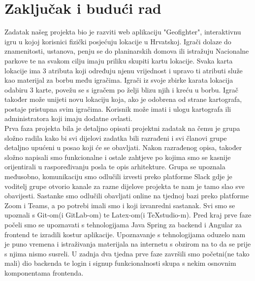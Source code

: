 \chapter{Zaključak i budući rad}
		
		\textnormal{Zadatak našeg projekta bio je razviti web aplikaciju "Geofighter", interaktivnu igru u kojoj korisnici fizički posjećuju lokacije u Hrvatskoj. Igrači dolaze do znamenitosti, ustanova, penju se do planinarskih domova ili istražuju Nacionalne parkove te na svakom cilju imaju priliku skupiti kartu lokacije. Svaka karta lokacije ima 3 atributa koji određuju njenu vrijednost i upravo ti atributi služe kao materijal za borbu među igračima. Igrači iz svoje zbirke karata lokacija odabiru 3 karte, povežu se s igračem po želji blizu njih i kreću u borbu. Igrač također može unijeti novu lokaciju koja, ako je odobrena od strane kartografa, postaje pristupna svim igračima. Korisnik može imati i ulogu kartografa ili administratora koji imaju dodatne ovlasti.}\\
		 
		 \textnormal{Prva faza projekta bila je detaljno opisati projektni zadatak na čemu je grupa složno radila kako bi svi dijelovi zadatka bili razrađeni i svi članovi grupe detaljno upućeni u posao koji će se obavljati. Nakon razrađenog opisa, također složno napisali smo funkcionalne i ostale zahtjeve po kojima smo se kasnije orijentirali u raspoređivanju posla te opis arhitekture. Grupa se upoznala međusobno, komunikaciju smo odlučili izvesti preko platforme Slack gdje je voditelj grupe otvorio kanale za razne dijelove projekta te nam je tamo slao sve obavijesti. Sastanke smo odlučili obavljati online na tjednoj bazi preko platforme Zoom i Teams, a po potrebi imali smo i koji izvanredni sastanak. Svi smo se upoznali s Git-om(i GitLab-om) te Latex-om(i TeXstudio-m). Pred kraj prve faze počeli smo se upoznavati s tehnologijama Java Spring za backend i Angular za frontend te izradili kostur aplikacije. Upoznavanje s tehnologijama oduzelo nam je puno vremena i istraživanja materijala na internetu s obzirom na to da se prije s njima nismo susreli. U zadnja dva tjedna prve faze završili smo početni(ne tako mali) dio backenda te login i signup funkcionalnosti skupa s nekim osnovnim komponentama frontenda.}\\
		 
